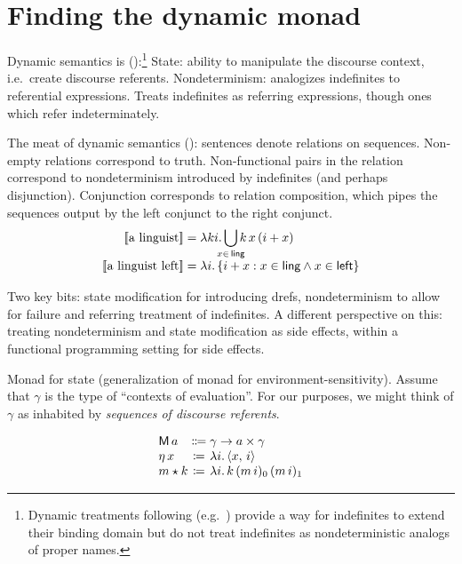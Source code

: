 \section{Finding the dynamic monad}
	Dynamic semantics is (\citealt{Shan:2001}):\footnote{Dynamic treatments following \citealt{GroenendijkStokhof:1990} (e.g.~\citealt{Zimmermann:1991, Dekker:1993, Szabolcsi:2003, Groote:2006}) provide a way for indefinites to extend their binding domain but do not treat indefinites as nondeterministic analogs of proper names.}%
		State: ability to manipulate the discourse context, i.e.~create discourse referents. %
		Nondeterminism: analogizes indefinites to referential expressions. Treats indefinites as referring expressions, though ones which refer indeterminately.%
	
	The meat of dynamic semantics (\citealt{Heim:1982, Kamp:1981, GroenendijkStokhof:1991, Dekker:1994}): sentences denote relations on sequences. Non-empty relations correspond to truth. Non-functional pairs in the relation correspond to nondeterminism introduced by indefinites (and perhaps disjunction). Conjunction corresponds to relation composition, which pipes the sequences output by the left conjunct to the right conjunct.%
	\[\begin{array}{r@{}l}
		\sv{\text{a linguist}} &{}= \lambda ki.\displaystyle\bigcup_{\mathclap{x\in\,\textsf{ling}}}k\,x\,(i + x)%
		\\
		\sv{\text{a linguist left}} &{}= \lambda i.\,\{i + x : x \in \textsf{ling} \wedge x \in \textsf{left}\}%
	\end{array}\]%

	Two key bits: state modification for introducing drefs, nondeterminism to allow for failure and referring treatment of indefinites. A different perspective on this: treating nondeterminism and state modification as side effects, within a functional programming setting for side effects. %
	
	Monad for state (generalization of monad for environment-sensitivity). Assume that $\gamma$ is the type of ``contexts of evaluation''. For our purposes, we might think of $\gamma$ as inhabited by \emph{sequences of discourse referents}.%
	\begin{defi}\label{state}
		\[\begin{array}[t]
			{@{}l@{}c@{}l@{}}
			\textsf{M}\,a &{}\Coloneqq{} &\gamma \ra a \times \gamma	%
			\\
			\eta\,x &{}\ceq{} &\lambda i.\,\ab{x,\,i}
			\\
			m \star k &{}\ceq{} &\lambda i.\,k\,(m\,i)_0\,(m\,i)_1%
		\end{array}\]
	\end{defi}
	
